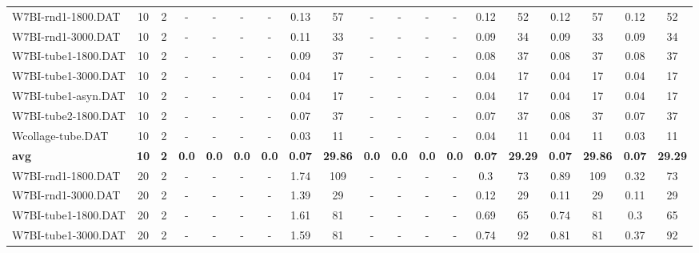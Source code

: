 \begin{sidewaystable}[!ht]
{\begin{tabular}{lcccccccccccccccccc}
W7BI-rnd1-1800.DAT & 10 & 2 &  - &  - &  - &  - & 0.13 & 57 &  - &  - &  - &  - &  \textcolor{blue2}{0.12} & 52 &  \textcolor{blue2}{0.12} & 57 &  \textcolor{blue2}{0.12} & 52 \\
W7BI-rnd1-3000.DAT & 10 & 2 &  - &  - &  - &  - & 0.11 & 33 &  - &  - &  - &  - &  \textcolor{blue2}{0.09} & 34 &  \textcolor{blue2}{0.09} & 33 &  \textcolor{blue2}{0.09} & 34 \\
W7BI-tube1-1800.DAT & 10 & 2 &  - &  - &  - &  - & 0.09 & 37 &  - &  - &  - &  - &  \textcolor{blue2}{0.08} & 37 &  \textcolor{blue2}{0.08} & 37 &  \textcolor{blue2}{0.08} & 37 \\
W7BI-tube1-3000.DAT & 10 & 2 &  - &  - &  - &  - &  \textcolor{blue2}{0.04} & 17 &  - &  - &  - &  - &  \textcolor{blue2}{0.04} & 17 &  \textcolor{blue2}{0.04} & 17 &  \textcolor{blue2}{0.04} & 17 \\
W7BI-tube1-asyn.DAT & 10 & 2 &  - &  - &  - &  - &  \textcolor{blue2}{0.04} & 17 &  - &  - &  - &  - &  \textcolor{blue2}{0.04} & 17 &  \textcolor{blue2}{0.04} & 17 &  \textcolor{blue2}{0.04} & 17 \\
W7BI-tube2-1800.DAT & 10 & 2 &  - &  - &  - &  - &  \textcolor{blue2}{0.07} & 37 &  - &  - &  - &  - &  \textcolor{blue2}{0.07} & 37 & 0.08 & 37 &  \textcolor{blue2}{0.07} & 37 \\
Wcollage-tube.DAT & 10 & 2 &  - &  - &  - &  - &  \textcolor{blue2}{0.03} & 11 &  - &  - &  - &  - & 0.04 & 11 & 0.04 & 11 &  \textcolor{blue2}{0.03} & 11 \\
\cline{1-19} \textbf{avg} & \textbf{10} & \textbf{2} & \textbf{0.0} & \textbf{0.0} & \textbf{0.0} & \textbf{0.0} & \textbf{0.07} & \textbf{29.86} & \textbf{0.0} & \textbf{0.0} & \textbf{0.0} & \textbf{0.0} & \textbf{0.07} & \textbf{29.29} & \textbf{0.07} & \textbf{29.86} & \textbf{0.07} & \textbf{29.29} \\ \cline{1-19}
W7BI-rnd1-1800.DAT & 20 & 2 &  - &  - &  - &  - & 1.74 & 109 &  - &  - &  - &  - &  \textcolor{blue2}{0.3} & 73 & 0.89 & 109 & 0.32 & 73 \\
W7BI-rnd1-3000.DAT & 20 & 2 &  - &  - &  - &  - & 1.39 & 29 &  - &  - &  - &  - & 0.12 & 29 &  \textcolor{blue2}{0.11} & 29 &  \textcolor{blue2}{0.11} & 29 \\
W7BI-tube1-1800.DAT & 20 & 2 &  - &  - &  - &  - & 1.61 & 81 &  - &  - &  - &  - & 0.69 & 65 & 0.74 & 81 &  \textcolor{blue2}{0.3} & 65 \\
W7BI-tube1-3000.DAT & 20 & 2 &  - &  - &  - &  - & 1.59 & 81 &  - &  - &  - &  - & 0.74 & 92 & 0.81 & 81 &  \textcolor{blue2}{0.37} & 92 \\

\end{tabular}}
\end{sidewaystable}
